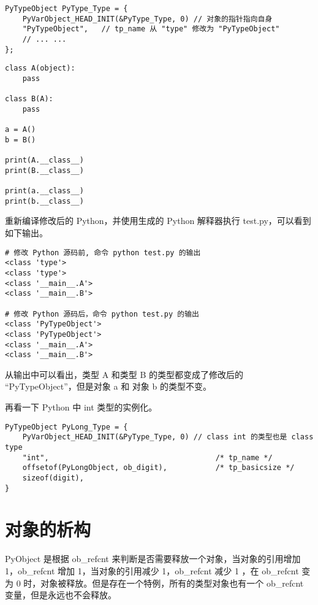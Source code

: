 \documentclass[12pt]{article}
\begin{document}
\begin{lstlisting}[caption={修改 typeobject.c}]
PyTypeObject PyType_Type = {
    PyVarObject_HEAD_INIT(&PyType_Type, 0) // 对象的指针指向自身
    "PyTypeObject",   // tp_name 从 "type" 修改为 "PyTypeObject"
    // ... ...
};
\end{lstlisting}

\begin{lstlisting}[caption={创建 test.py}]
class A(object):
    pass

class B(A):
    pass

a = A()
b = B()

print(A.__class__)
print(B.__class__)

print(a.__class__)
print(b.__class__)
\end{lstlisting}

重新编译修改后的 Python，并使用生成的 Python 解释器执行 test.py，可以看到如下输出。

\newpage
\begin{lstlisting}[caption={test.py 运行输出}]
# 修改 Python 源码前, 命令 python test.py 的输出
<class 'type'>
<class 'type'>
<class '__main__.A'>
<class '__main__.B'>

# 修改 Python 源码后，命令 python test.py 的输出
<class 'PyTypeObject'>
<class 'PyTypeObject'>
<class '__main__.A'>
<class '__main__.B'>
\end{lstlisting}

从输出中可以看出，类型 A 和类型 B 的类型都变成了修改后的 “PyTypeObject”，但是对象 a 和 对象 b 的类型不变。

再看一下 Python 中 int 类型的实例化。

\begin{lstlisting}[caption={int 类型类的实例化}]
PyTypeObject PyLong_Type = {
    PyVarObject_HEAD_INIT(&PyType_Type, 0) // class int 的类型也是 class type
    "int",                                      /* tp_name */
    offsetof(PyLongObject, ob_digit),           /* tp_basicsize */
    sizeof(digit), 
}

\end{lstlisting}

\section*{对象的析构}

PyObject 是根据 ob\_refcnt 来判断是否需要释放一个对象，当对象的引用增加 1，ob\_refcnt 增加 1，当对象的引用减少 1，ob\_refcnt 减少 1
，在 ob\_refcnt 变为 0 时，对象被释放。但是存在一个特例，所有的类型对象也有一个 ob\_refcnt 变量，但是永远也不会释放。
\end{document}
